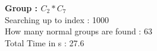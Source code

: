 \textbf{Group : $C_2*C_7$}\\
Searching up to index : 1000\\
How many normal groups are found : 63\\
Total Time in s : 27.6\\

